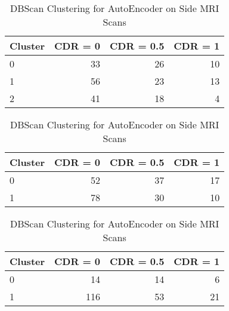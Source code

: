 \begin{table}[h] \centering
\begin{minipage}{0.3\textwidth}

\begin{tabular}{lrrr}
\toprule
Cluster & CDR = 0 & CDR = 0.5 & CDR = 1\\
\midrule
0 & 33 & 26 & 10\\
1 & 56 & 23 & 13\\
2 & 41 & 18 & 4\\
\bottomrule
\end{tabular}
\caption{Kmeans Clustering with 3 Clusters for AutoEncoder on Side MRI Scans}
\end{minipage}
\hspace{3cm}
\begin{minipage}{0.3\textwidth}

\begin{tabular}{lrrr}
\toprule
Cluster & CDR = 0 & CDR = 0.5 & CDR = 1\\
\midrule
0 & 52 & 37 & 17\\
1 & 78 & 30 & 10\\
\bottomrule
\end{tabular}
\caption{Kmeans Clustering with 2 Clusters for AutoEncoder on Side MRI Scans}
\end{minipage}
\hspace{3cm}
\begin{minipage}{0.3\textwidth}

\begin{tabular}{lrrr}
\toprule
Cluster & CDR = 0 & CDR = 0.5 & CDR = 1\\
\midrule
0 & 14 & 14 & 6\\
1 & 116 & 53 & 21\\
\bottomrule
\end{tabular}
\caption{DBScan Clustering for AutoEncoder on Side MRI Scans}
\end{minipage}
\end{table}
